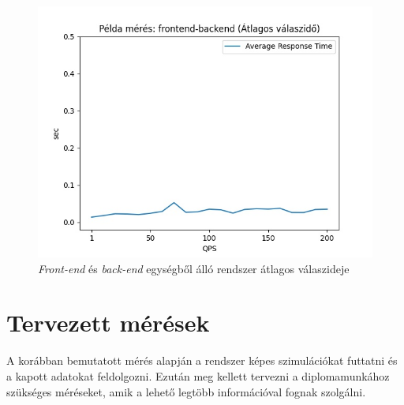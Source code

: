 \begin{figure}[!ht]
\centering
\includegraphics[width=150mm, keepaspectratio]{figures/sample_plot_responsetime.jpg}
\caption{\textit{Front-end} és \textit{back-end} egységből álló rendszer átlagos válaszideje}
\label{fig:example_responsetime}
\end{figure}

\section{Tervezett mérések}
A korábban bemutatott mérés alapján a rendszer képes szimulációkat futtatni és a kapott adatokat feldolgozni.
Ezután meg kellett tervezni a diplomamunkához szükséges méréseket, amik a lehető legtöbb információval fognak szolgálni.

